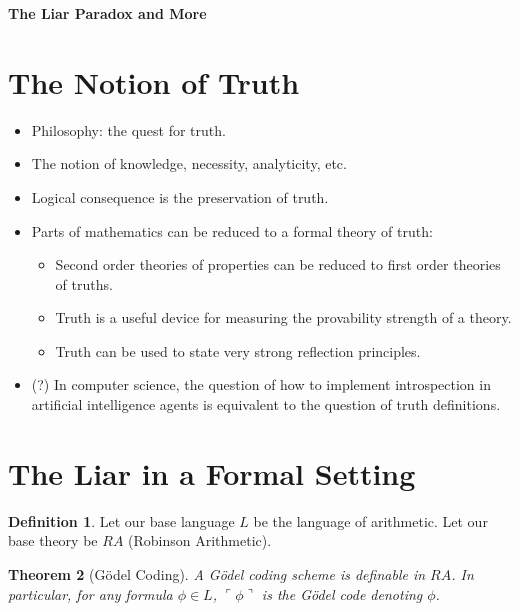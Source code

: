 \documentclass[12pt]{article}
\newtheorem{theo}{Theorem}[section]
\theoremstyle{definition}
\newtheorem{defin}[theo]{Definition}
\begin{document}




\begin{center}
{\Large \bf The Liar Paradox and More}
\end{center}

\smallskip

\section{The Notion of Truth}

\begin{itemize}
\item Philosophy: the quest for truth.
\item The notion of knowledge, necessity, analyticity, etc.
\item Logical consequence is the preservation of truth.
\item Parts of mathematics can be reduced to a formal theory of truth:
\begin{itemize}
\item Second order theories of properties can be reduced to first order theories of truths.
\item Truth is a useful device for measuring the provability strength of a theory.
\item Truth can be used to state very strong reflection principles.
\end{itemize}
\item (?) In computer science, the question of how to implement introspection in artificial intelligence agents is equivalent to the question of truth definitions.

\end{itemize}

\section{The Liar  in a Formal Setting}

\begin{defin}
Let our base language $L$ be the language of arithmetic. Let our base theory be $RA$ (Robinson Arithmetic). 
\end{defin}

\begin{theo} [G\"odel Coding]
A G\"odel coding scheme is definable in $RA$. In particular, for any formula   $\phi \in L$, $\ulcorner \phi \urcorner$ is the G\"odel code denoting $\phi$.
\end{theo}
\end{document}
